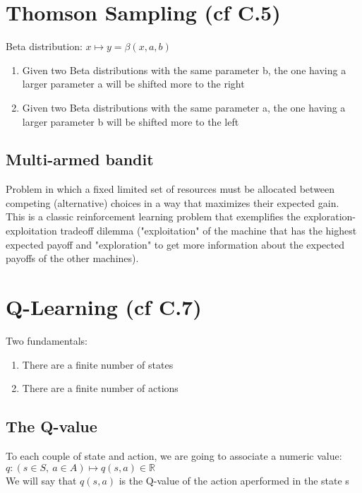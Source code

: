 \documentclass[french]{article}
\begin{document}
\section{Thomson Sampling (cf C.5)}
Beta distribution: $x \mapsto y = \beta(x,a,b)$\\


\begin{enumerate}
\item Given two Beta distributions with the same parameter b, the one having a larger parameter a will be shifted more to the right
\item Given two Beta distributions with the same parameter a, the one having a larger parameter b will be shifted more to the left

\end{enumerate}

\subsection{Multi-armed bandit}

Problem in which a fixed limited set of resources must be allocated between competing (alternative) choices in a way that maximizes their expected gain.\\
This is a classic reinforcement learning problem that exemplifies the exploration-exploitation tradeoff dilemma ("exploitation" of the machine that has the highest expected payoff and "exploration" to get more information about the expected payoffs of the other machines).


\section{Q-Learning (cf C.7)}
Two fundamentals:
\begin{enumerate}
	\item There are a finite number of states
	\item There are a finite number of actions
\end{enumerate}

\subsection{The Q-value}
To each couple of state and action, we are going to associate a numeric value: $q: (s \in S,\ a \in A) \mapsto q(s,a) \in \mathbb{R}$\\
We will say that $q(s,a)$ is the Q-value of the action aperformed in the state s
\end{document}
